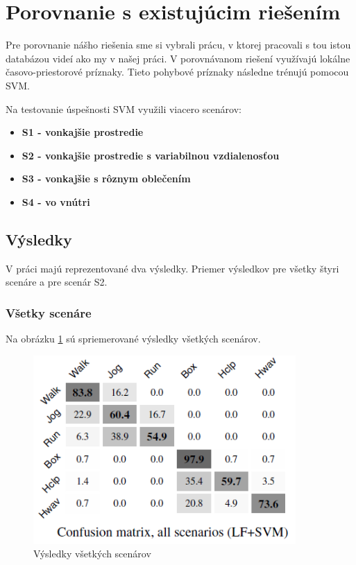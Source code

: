 \section{Porovnanie s existujúcim riešením}
Pre porovnanie nášho riešenia sme si vybrali prácu, v ktorej pracovali s tou istou databázou videí ako my v našej práci. V porovnávanom riešení využívajú lokálne časovo-priestorové príznaky. Tieto pohybové príznaky následne trénujú pomocou SVM. 

Na testovanie úspešnosti SVM využili viacero scenárov:

\begin{itemize}
\item \textbf{S1 - vonkajšie prostredie}
\item \textbf{S2 - vonkajšie prostredie s variabilnou vzdialenosťou}
\item \textbf{S3 - vonkajšie s rôznym oblečením}
\item \textbf{S4 - vo vnútri}
\end{itemize}

\subsection{Výsledky}
V práci majú reprezentované dva výsledky. Priemer výsledkov pre všetky štyri scenáre a pre scenár S2.

\subsubsection{Všetky scenáre}

Na obrázku \ref{cmp1} sú spriemerované výsledky všetkých scenárov. 
\begin{figure}[H]
  \centering
  \includegraphics[width=10cm]{img/cmpLFSVM.png}
  \caption{Výsledky všetkých scenárov}
  \label{cmp1}
\end{figure}  


